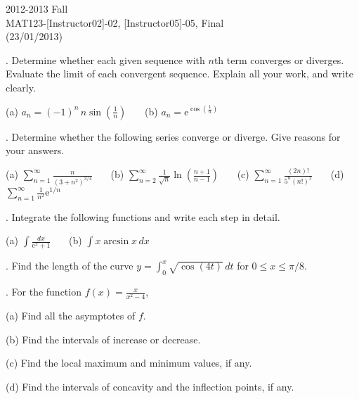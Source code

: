 \documentclass{article}
\begin{document}
\pagestyle{empty}
\large

\begin{center}
2012-2013 Fall \\MAT123-[Instructor02]-02, [Instructor05]-05, Final\\(23/01/2013)
\end{center}

. Determine whether each given sequence with $n$th term converges or diverges. Evaluate the limit of each convergent sequence. Explain all your work, and write clearly.

\hfill

(a) $\displaystyle a_n=(-1)^n\,n\sin\left(\frac1n\right)$ \ \ \ (b) $\displaystyle a_n=\mathrm{e}^{\cos\left(\textstyle\frac1n\right)}$

\hfill

. Determine whether the following series converge or diverge. Give reasons for your answers.

\hfill

(a) $\displaystyle\sum_{n=1}^\infty\frac n{\left(3+n^2\right)^{3/4}}$ \ \ \ (b) $\displaystyle\sum_{n=2}^\infty\frac1{\sqrt n}\ln\left(\frac{n+1}{n-1}\right)$ \ \ \ (c) $\displaystyle\sum_{n=1}^\infty\frac{(2n)!}{5^n\left(n!\right)^2}$ \ \ \ (d) $\displaystyle\sum_{n=1}^\infty\frac1{n^2}\mathrm{e}^{1/n}$

\hfill

. Integrate the following functions and write each step in detail.

\hfill

(a) $\displaystyle\int\frac{dx}{\mathrm{e}^x+1}$ \ \ \ (b) $\displaystyle\int x\arcsin x\,dx$

\hfill

. Find the length of the curve $\displaystyle y=\int_0^x\sqrt{\cos\left(4t\right)}\,dt$ for $0\leq x\leq \pi/8$.

\hfill

. For the function $\displaystyle f(x)=\frac x{x^2-4}$,

\hfill

(a) Find all the asymptotes of $f$.

\hfill

(b) Find the intervals of increase or decrease.

\hfill

(c) Find the local maximum and minimum values, if any.

\hfill

(d) Find the intervals of concavity and the inflection points, if any.
\end{document}
